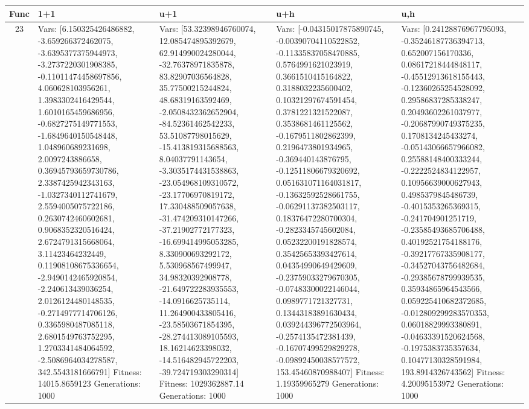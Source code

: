 \documentclass[landscape,11pt]{article}
\begin{document}
\newpage
\begin{tabular}{|c|p{5.4cm}|p{5.4cm}|p{5.4cm}|p{5.4cm}|}
\hline
Func & 1+1 & u+1 & u+h & u,h \\ 
\hline 23 & Vars: [6.150325426486882, -3.659266372462075, -3.6395377375944973, -3.2737220301908385, -0.11011474458697856, 4.060628103956261, 1.3983302416429544, 1.6010165459686956, -0.6827275149771553, -1.6849640150548448, 1.048960689231698, 2.0097243886658, 0.36945793659730786, 2.3387425942343163, -1.0327340112741679, 2.5594005075722186, 0.2630742460602681, 0.9068352320516424, 2.6724791315668064, 3.11423464232449, 0.11908108675336654, -2.9490142465920854, -2.240613439036254, 2.0126124480148535, -0.2714977714706126, 0.3365980487085118, 2.6801549763752295, 1.2703341484064592, -2.5086964034278587, 342.5543181666791] Fitness: 14015.8659123 Generations: 1000 & Vars: [53.32398946760074, 12.085474895392679, 62.914990024280044, -32.76378971835878, 83.82907036564828, 35.77500215244824, 48.68319163592469, -2.0508432362652904, -84.52361462542233, 53.51087798015629, -15.413819315688563, 8.04037791143654, -3.3035174431538863, -23.054968109310572, -23.17706970819172, 17.330488509057638, -31.474209310147266, -37.21902772177323, -16.699414995053285, 8.330900693292172, 5.530968567499947, 34.98320392908778, -21.649722283935553, -14.0916625735114, 11.264900433805416, -23.58503671854395, -28.274413089105593, 18.16214623398032, -14.516482945722203, -39.724719303290314] Fitness: 1029362887.14 Generations: 1000 & Vars: [-0.04315017875890745, -0.00390704110522852, -0.11335837058470885, 0.5764991621023919, 0.3661510415164822, 0.3188032235600402, 0.10321297674591454, 0.3781221321522087, 0.3538681461125562, -0.1679511802862399, 0.2196473801934965, -0.369440143876795, -0.12511806679320692, 0.051631071164031817, -0.13632592528661755, -0.06291137382503117, 0.18376472280700304, -0.2823345745602084, 0.05232200191828574, 0.35425653393427614, 0.04354990649429609, -0.23759033279670305, -0.07483300022146044, 0.0989771721327731, 0.13443183891630434, 0.039244396772503964, -0.2574135472381439, -0.16707499529829278, -0.09892450038577572, 153.45460870988407] Fitness: 1.19359965279 Generations: 1000 & Vars: [0.24128876967795093, -0.35246187736394713, 0.652007156170336, 0.08617218444848117, -0.45512913618155443, -0.12360265254528092, 0.29586837285338247, 0.20493602261037977, -0.20687990749375235, 0.1708134245433274, -0.05143066657966082, 0.25588148400333244, -0.2222524834122957, 0.10956639000627943, 0.4985379845486739, -0.4015353265369315, -0.241704901251719, -0.23585493685706488, 0.40192521754188176, -0.39217767335908177, -0.34527043756482684, -0.29385678799939535, 0.35934865964543566, 0.059225410682372685, -0.012809299283570353, 0.06018829993380891, -0.04633391520624568, -0.1975383735357634, 0.10477130328591984, 193.8914326743562] Fitness: 4.20095153972 Generations: 1000 \\
 \hline 
\end{tabular}
\end{document}
